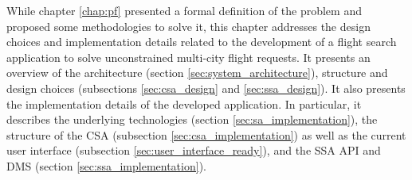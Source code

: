 While chapter \ref{chap:pf} presented a formal definition of the problem and proposed some methodologies to solve it, this chapter addresses the design choices and implementation details related to the development of a flight search application to solve unconstrained multi-city flight requests. It presents an overview of the architecture (section \ref{sec:system_architecture}), structure and design choices (subsections \ref{sec:csa_design} and \ref{sec:ssa_design}). It also presents the implementation details of the developed application. In particular, it describes the underlying technologies (section \ref{sec:sa_implementation}), the structure of the CSA (subsection \ref{sec:csa_implementation}) as well as the current user interface (subsection \ref{sec:user_interface_ready}), and the SSA API and DMS (section \ref{sec:ssa_implementation}).  
